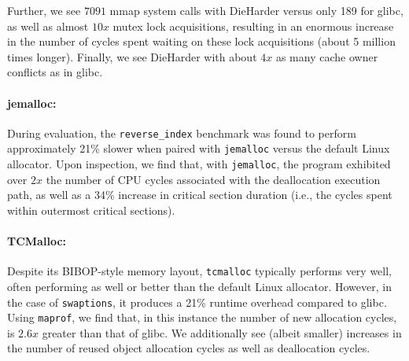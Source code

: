 	Further, we see $7091$ mmap system calls with DieHarder versus only 189 for glibc, as well as almost $10x$ mutex lock acquisitions, resulting in an enormous increase in the number of cycles spent waiting on these lock acquisitions (about 5 million times longer).
	Finally, we see DieHarder with about $4x$ as many cache owner conflicts as in glibc.

\paragraph{jemalloc:}
During evaluation, the \texttt{reverse\_index} benchmark was found to perform approximately 21\% slower when paired with \texttt{jemalloc} versus the default Linux allocator. Upon inspection, we find that, with \texttt{jemalloc}, the program exhibited over $2x$ the number of CPU cycles associated with the deallocation execution path, as well as a 34\% increase in critical section duration (i.e., the cycles spent within outermost critical sections).

\paragraph{TCMalloc:}
Despite its BIBOP-style memory layout, \texttt{tcmalloc} typically performs very well, often performing as well or better than the default Linux allocator. However, in the case of \texttt{swaptions}, it produces a 21\% runtime overhead compared to glibc. Using \texttt{maprof}, we find that, in this instance the number of new allocation cycles, is $2.6x$ greater than that of glibc. We additionally see (albeit smaller) increases in the number of reused object allocation cycles as well as deallocation cycles.

